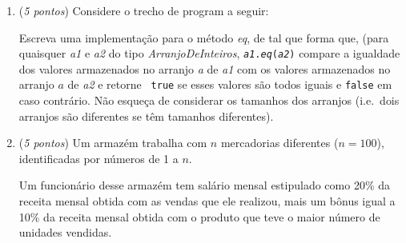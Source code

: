 \documentclass[brazil]{article}
\begin{document}
\begin{enumerate}
\begin{enumerate}
\end{enumerate}

\begin{center}
\begin{tabular}{c}
\ *\ \\
\ ***\ \\
\ *****\ \\
\ *******\ \\
\ *****\ \\
\ ***\ \\
\ *\ \\
\end{tabular}
\end{center}



\item ({\em 5 pontos\/}) Considere o trecho de program a seguir:


Escreva uma implementa\c{c}\~ao para o m\'etodo {\it eq\/}, de tal que
forma que, (para quaisquer {\it a1\/} e {\it a2\/} do tipo {\it
ArranjoDeInteiros\/}, {\tt {\it a1}.{\it eq\/}({\it a2\/})} compare a
igualdade dos valores armazenados no arranjo {\it a\/} de {\it a1\/}
com os valores armazenados no arranjo $a$ de {\it a2\/} e retorne {\tt
true} se esses valores s\~ao todos iguais e {\tt false} em caso
contr\'ario. N\~ao esque\c{c}a de considerar os tamanhos dos arranjos
(i.e.~dois arranjos s\~ao diferentes se t\^em tamanhos diferentes).

\item ({\it 5 pontos\/}) Um armaz\'em trabalha com $n$ mercadorias
diferentes ($n=100$), identificadas por n\'umeros de 1 a $n$.

Um funcion\'ario desse armaz\'em tem sal\'ario mensal estipulado como
20\% da receita mensal obtida com as vendas que ele realizou, mais um
b\^onus igual a 10\% da receita mensal obtida com o produto que teve o
maior n\'umero de unidades vendidas.


\end{enumerate}
\end{document}
